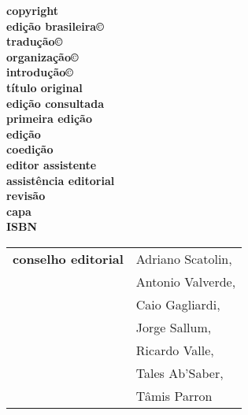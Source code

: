\newcommand{\linha}[2]{\ifdef{#2}{\linhalayout{#1}{#2}}{}}

\begingroup\tiny
\parindent=0cm
\thispagestyle{empty}

\textbf{copyright}\quad                      	  {}\\
\textbf{edição brasileira©}\\
\textbf{tradução©}\\
\textbf{organização©}\\
\textbf{introdução©}\quad			 		 {}\\

\textbf{título original}\\
\textbf{edição consultada}\quad			     {}\\
\textbf{primeira edição}\quad			 	 {[Hedra, 2008]}\\

\textbf{edição}\\
\textbf{coedição}\\	
\textbf{editor assistente}\\
\textbf{assistência editorial}\\
\textbf{revisão}\\
\textbf{capa}\\

\textbf{ISBN}\smallskip

\hspace{-5pt}\begin{tabular}{ll}
\textbf{conselho editorial} & Adriano Scatolin,  \\
							& Antonio Valverde,  \\
							& Caio Gagliardi,    \\
							& Jorge Sallum,      \\
							& Ricardo Valle,     \\
							& Tales Ab'Saber,    \\
							& Tâmis Parron      
\end{tabular}
  
